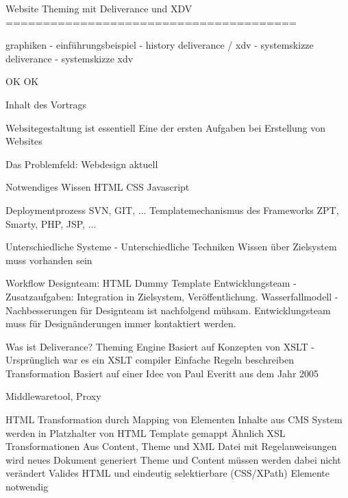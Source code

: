 Website Theming mit Deliverance und XDV
=======================================

graphiken
- einführungsbeispiel
- history deliverance / xdv
- systemskizze deliverance
- systemskizze xdv




OK %
OK %





Inhalt des Vortrags

Websitegestaltung ist essentiell
    Eine der ersten Aufgaben bei Erstellung von Websites

Das Problemfeld: Webdesign aktuell

    Notwendiges Wissen
        HTML
        CSS
        Javascript

        Deploymentprozess
            SVN, GIT, ...
        Templatemechanismus des Frameworks
            ZPT, Smarty, PHP, JSP, ...

        Unterschiedliche Systeme - Unterschiedliche Techniken
        Wissen über Zielsystem muss vorhanden sein

    Workflow
        Designteam: HTML Dummy Template
        Entwicklungsteam - Zusatzaufgaben: Integration in Zielsystem, Veröffentlichung.
        Wasserfallmodell - Nachbesserungen für Designteam ist nachfolgend mühsam. Entwicklungsteam muss für Designänderungen immer kontaktiert werden.



Was ist Deliverance?
    Theming Engine
        Basiert auf Konzepten von XSLT - Ursprünglich war es ein XSLT compiler
        Einfache Regeln beschreiben Transformation
        Basiert auf einer Idee von Paul Everitt aus dem Jahr 2005

    Middlewaretool, Proxy

    HTML Transformation durch Mapping von Elementen
        Inhalte aus CMS System werden in Platzhalter von HTML Template gemappt
        Ähnlich XSL Transformationen
        Aus Content, Theme und XML Datei mit Regelanweisungen wird neues Dokument generiert
        Theme und Content müssen werden dabei nicht verändert
        Valides HTML und eindeutig selektierbare (CSS/XPath) Elemente notwendig

